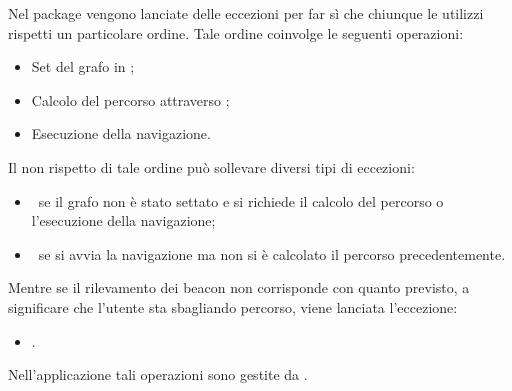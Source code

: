 \documentclass[../Funzionalita.tex]{subfiles}
\begin{document}
			Nel package \navigator vengono lanciate delle eccezioni per far sì che chiunque le utilizzi rispetti un particolare ordine. Tale ordine coinvolge le seguenti operazioni:
			\begin{itemize}
				\item Set del grafo in \NavigatorImp;
				\item Calcolo del percorso attraverso \NavigatorImp;
				\item Esecuzione della navigazione.
			\end{itemize}
			Il non rispetto di tale ordine può sollevare diversi tipi di eccezioni:
			\begin{itemize}
				\item \NoGraphSetException\ se il grafo non è stato settato e si richiede il calcolo del percorso o l'esecuzione della navigazione;
				\item \NoNavigationInformationException\ se si avvia la navigazione ma non si è calcolato il percorso precedentemente.
			\end{itemize}
			Mentre se il rilevamento dei \gls{beacon} non corrisponde con quanto previsto, a significare che l'utente sta sbagliando percorso, viene lanciata l'eccezione:
			\begin{itemize}
				\item \PathException.
			\end{itemize}
			Nell'applicazione tali operazioni sono gestite da \NavigationManagerImp.
\end{document}
